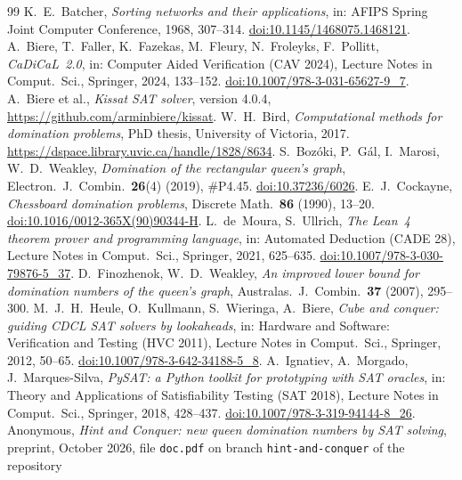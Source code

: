 \documentclass[11pt]{article}
\theoremstyle{definition}
\theoremstyle{remark}
\begin{document}
\raggedright
\begin{thebibliography}{99}
 K.~E.~Batcher, \emph{Sorting networks and their applications}, in: AFIPS Spring Joint
Computer Conference, 1968, 307--314.
\href{https://doi.org/10.1145/1468075.1468121}{doi:10.1145/1468075.1468121}.
 A.~Biere, T.~Faller, K.~Fazekas, M.~Fleury, N.~Froleyks, F.~Pollitt, \emph{CaDiCaL~2.0},
in: Computer Aided Verification (CAV 2024), Lecture Notes in Comput.\ Sci., Springer, 2024, 133--152.
\href{https://doi.org/10.1007/978-3-031-65627-9_7}{doi:10.1007/978-3-031-65627-9\_7}.
 A.~Biere et al., \emph{Kissat SAT solver}, version 4.0.4,
\url{https://github.com/arminbiere/kissat}.
 W.~H.~Bird, \emph{Computational methods for domination problems}, PhD thesis, University of
Victoria, 2017. \url{https://dspace.library.uvic.ca/handle/1828/8634}.
 S.~Boz\'oki, P.~G\'al, I.~Marosi, W.~D.~Weakley, \emph{Domination of the rectangular queen's
graph}, Electron.\ J.\ Combin.\ \textbf{26}(4) (2019), \#P4.45.
\href{https://doi.org/10.37236/6026}{doi:10.37236/6026}.
 E.~J.~Cockayne, \emph{Chessboard domination problems}, Discrete Math.\ \textbf{86}
(1990), 13--20. \href{https://doi.org/10.1016/0012-365X(90)90344-H}{doi:10.1016/0012-365X(90)90344-H}.
 L.~de~Moura, S.~Ullrich, \emph{The Lean~4 theorem prover and programming language}, in:
Automated Deduction (CADE 28), Lecture Notes in Comput.\ Sci., Springer, 2021, 625--635.
\href{https://doi.org/10.1007/978-3-030-79876-5_37}{doi:10.1007/978-3-030-79876-5\_37}.
 D.~Finozhenok, W.~D.~Weakley, \emph{An improved lower bound for domination numbers of the
queen's graph}, Australas.\ J.\ Combin.\ \textbf{37} (2007), 295--300.
 M.~J.~H.~Heule, O.~Kullmann, S.~Wieringa, A.~Biere, \emph{Cube and conquer:
guiding CDCL SAT solvers by lookaheads}, in: Hardware and Software: Verification and Testing (HVC 2011),
Lecture Notes in Comput.\ Sci., Springer, 2012, 50--65.
\href{https://doi.org/10.1007/978-3-642-34188-5_8}{doi:10.1007/978-3-642-34188-5\_8}.
 A.~Ignatiev, A.~Morgado, J.~Marques-Silva, \emph{PySAT: a Python toolkit for prototyping
with SAT oracles}, in: Theory and Applications of Satisfiability Testing (SAT 2018), Lecture Notes in
Comput.\ Sci., Springer, 2018, 428--437.
\href{https://doi.org/10.1007/978-3-319-94144-8_26}{doi:10.1007/978-3-319-94144-8\_26}.
 Anonymous, \emph{Hint and Conquer: new queen domination numbers by SAT solving}, preprint,
October 2026, file \texttt{doc.pdf} on branch \texttt{hint-and-conquer} of the repository

\end{thebibliography}
\end{document}
